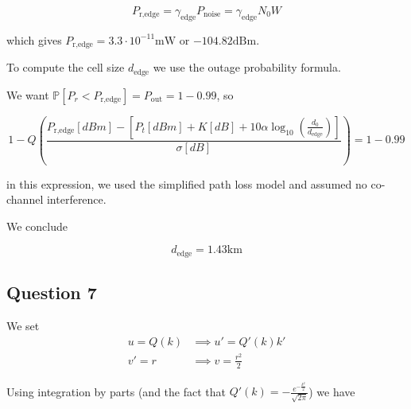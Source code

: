 \documentclass[]{article}
\begin{document}
	\begin{equation}
		P_{\text{r,edge}} = \gamma_{\text{edge}}P_{\text{noise}} = \gamma_{\text{edge}}N_0W
	\end{equation}
	
	which gives $P_{\text{r,edge}} = 3.3 \cdot 10^{-11}\mathrm{mW}$ or $-104.82\mathrm{dBm}$.
	
	To compute the cell size $d_{\text{edge}}$ we use the outage probability formula.
	
	We want $\mathbb{P}[P_r < P_{\text{r,edge}}] = P_{\text{out}} = 1 - 0.99$, so
	
	\begin{equation}
		1 - Q\left(\frac{P_{\text{r,edge}}[dBm] - \left[P_t[dBm] + K[dB] +  10\alpha\log_{10}\left(\frac{d_0}{d_{\text{edge}}}\right)\right]}{\sigma[dB]} \right) = 1 - 0.99
	\end{equation}
	
	in this expression, we used the simplified path loss model and assumed no co-channel interference.
	
	We conclude
	
	\begin{equation}
		d_{\text{edge}} = 1.43 \mathrm{km}
	\end{equation}
	
	\subsection*{Question 7}
	
	We set 
	\begin{align}
		u = Q(k) &\implies u' = Q'(k)k'\\
		v' = r &\implies v = \frac{r^2}{2}
	\end{align}
	
	Using integration by parts (and the fact that $Q'(k) = -\frac{e^{-\frac{k^2}{2}}}{\sqrt{2\pi}}$) we have
	
\end{document}
